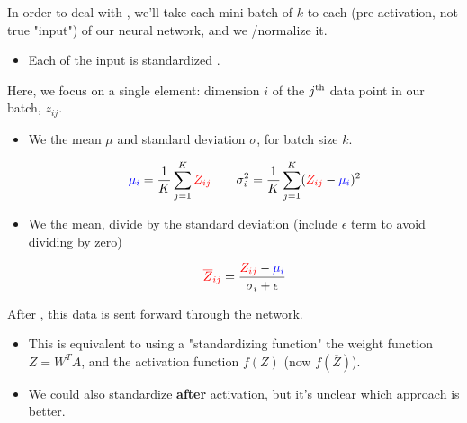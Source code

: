             \begin{concept}
                In order to deal with , we'll take each mini-batch of $k$  to each  (pre-activation, not true "input") of our neural network, and we /normalize it.

                \begin{itemize}
                    \item Each  of the input is standardized .
                \end{itemize}

                \subsecdiv

                Here, we focus on a single element: dimension $i$ of the $j^{ \text{th} }$ data point in our batch, $z_{ij}$.

                \begin{itemize}
                    \item We  the mean $\mu$ and standard deviation $\sigma$, for batch size $k$.

                    \begin{equation*}
                        \textcolor{blue}{\mu_i} =\frac{1}{K} \sum_{j=1}^K \textcolor{red}{Z_{ij}}
                        \qquad
                        \sigma^2_i = \frac{1}{K} \sum_{j=1}^K (\textcolor{red}{Z_{ij}}-\textcolor{blue}{\mu_i})^2 
                    \end{equation*}
                    
                    \item We  the mean, divide by the standard deviation (include $\epsilon$ term to avoid dividing by zero)

                    \begin{equation*}
                        \textcolor{red}{ \overline{Z}_{ij} } =  \frac{ \textcolor{red}{Z_{ij}}  -\textcolor{blue}{\mu_i}}{\sigma_i+\epsilon}
                    \end{equation*}

                    
                \end{itemize}

                \subsecdiv

                After , this data is sent forward through the network.

                \begin{itemize}
                    \item This is equivalent to using a "standardizing function"  the weight function $Z=W^TA$, and  the activation function $f(Z)$ (now $f(\overline{Z})$).
                    \item We could also standardize \textbf{after} activation, but it's unclear which approach is better.
                \end{itemize}
                
            \end{concept}

